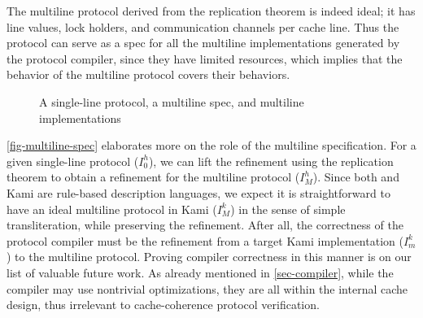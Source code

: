 \documentclass[sigplan,10pt,review,anonymous,screen]{acmart}\settopmatter{printfolios=true,printccs=false,printacmref=false}
\begin{document}
The multiline protocol derived from the replication theorem is indeed ideal; it has line values, lock holders, and communication channels per cache line.
Thus the protocol can serve as a spec for all the multiline implementations generated by the protocol compiler, since they have limited resources, which implies that the behavior of the multiline protocol covers their behaviors.

\begin{figure}[h]
  \centering
  \caption{A single-line protocol, a multiline spec, and multiline implementations}
  \label{fig-multiline-spec}
\end{figure}

\autoref{fig-multiline-spec} elaborates more on the role of the multiline specification.
For a given \hemiola{} single-line protocol ($I^{h}_{0}$), we can lift the refinement using the replication theorem to obtain a refinement for the multiline protocol ($I^{h}_{M}$).
Since both \hemiola{} and Kami are rule-based description languages, we expect it is straightforward to have an ideal multiline protocol in Kami ($I^{k}_{M}$) in the sense of simple transliteration, while preserving the refinement.
After all, the correctness of the protocol compiler must be the refinement from a target Kami implementation ($I^{k}_{m}$) to the multiline protocol.
Proving compiler correctness in this manner is on our list of valuable future work.
As already mentioned in \autoref{sec-compiler}, while the compiler may use nontrivial optimizations, they are all within the internal cache design, thus irrelevant to cache-coherence protocol verification.
\end{document}
